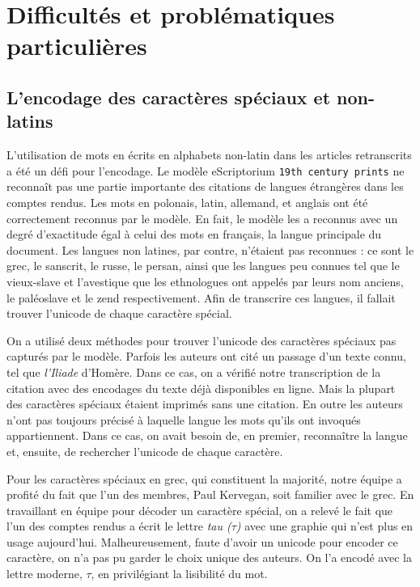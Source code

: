 \documentclass{article}
\begin{document}
	
	\section{Difficultés et problématiques particulières}
	
	
	
	\subsection{L'encodage des caractères spéciaux et non-latins}
	
	L'utilisation de mots en écrits en alphabets non-latin dans les articles retranscrits a été un défi pour l’encodage. Le modèle eScriptorium \texttt{19th century prints} ne reconnaît pas une partie importante des citations de langues étrangères dans les comptes rendus. Les mots en polonais, latin, allemand, et anglais ont été correctement reconnus par le modèle. En fait, le modèle les a reconnus avec un degré d’exactitude égal à celui des mots en français, la langue principale du document. Les langues non latines, par contre, n’étaient pas reconnues : ce sont le grec, le sanscrit, le russe, le persan, ainsi que les langues peu connues tel que le vieux-slave et l’avestique que les ethnologues ont appelés par leurs nom anciens, le paléoslave et le zend respectivement. Afin de transcrire ces langues, il fallait trouver l’unicode de chaque caractère spécial.
	
	On a utilisé deux méthodes pour trouver l’unicode des caractères spéciaux pas capturés par le modèle. Parfois les auteurs ont cité un passage d’un texte connu, tel que \textit{l’Iliade} d'Homère. Dans ce cas, on a vérifié notre transcription de la citation avec des encodages du texte déjà disponibles en ligne. Mais la plupart des caractères spéciaux étaient imprimés sans une citation. En outre les auteurs n’ont pas toujours précisé à laquelle langue les mots qu’ils ont invoqués appartiennent. Dans ce cas, on avait besoin de, en premier, reconnaître la langue et, ensuite, de rechercher l’unicode de chaque caractère.
	
	Pour les caractères spéciaux en grec, qui constituent la majorité, notre équipe a profité du fait que l'un des membres, Paul Kervegan, soit familier avec le grec. En travaillant en équipe pour décoder un caractère spécial, on a relevé le fait que l’un des comptes rendus a écrit le lettre \textit{tau ($\tau$)} avec une graphie qui n'est plus en usage aujourd'hui. Malheureusement, faute d'avoir un unicode pour encoder ce caractère, on n’a pas pu garder le choix unique des auteurs. On l’a encodé avec la lettre moderne, \textit{$\tau$}, en privilégiant la lisibilité du mot.
	
\end{document}
